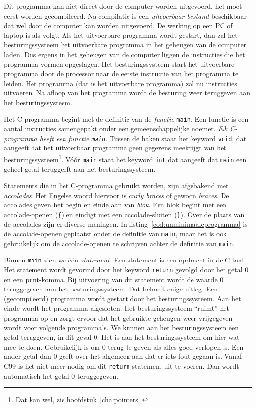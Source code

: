 Dit programma kan niet direct door de computer worden uitgevoerd, het moet eerst worden gecompileerd. Na compilatie is een \textsl{uitvoerbaar bestand} beschikbaar dat wel door de computer kan worden uitgevoerd. De werking op een PC of laptop is als volgt. Als het uitvoerbare programma wordt gestart, dan zal het besturingssysteem het uitvoerbare programma in het geheugen van de computer laden. Dus ergens in het geheugen van de computer liggen de instructies die het programma vormen opgeslagen. Het besturingssysteem start het uitvoerbare programma door de processor naar de eerste instructie van het programma te leiden. Het programma (dat is het uitvoerbare programma) zal nu instructies uitvoeren. Na afloop van het programma wordt de besturing weer teruggeven aan het besturingssysteem.

Het C-programma begint met de definitie van de \textsl{functie} \texttt{main}. Een functie is een aantal instructies samengepakt onder een gemeenschappelijke noemer. \textsl{Elk C-programma heeft een functie \texttt{main}}. Tussen de haken staat het keyword \texttt{void}, dat aangeeft dat het uitvoerbaar programma geen gegevens meekrijgt van het besturingssysteem\footnote{Dat kan wel, zie hoofdstuk~\ref{cha:pointers}.}. Vóór \texttt{main} staat het keyword \texttt{int} dat aangeeft dat \texttt{main} een geheel getal teruggeeft aan het besturingssysteem.
 
Statements die in het C-programma gebruikt worden, zijn afgebakend met \textsl{accolades}. Het Engelse woord hiervoor is \textsl{curly braces} of gewoon \textsl{braces}. De accolades geven het begin en einde aan van \textsl{blok}. Een blok begint met een accolade-openen (\texttt{\{}) en eindigt met een accolade-sluiten (\texttt{\}}). Over de plaats van de accolades zijn er diverse meningen. In listing~\ref{cod:unminimaalcprogramma} is de accolade-openen geplaatst onder de definitie van \texttt{main}, maar het is ook gebruikelijk om de accolade-openen te schrijven achter de definitie van \texttt{main}.
 
Binnen \texttt{main} zien we één \textsl{statement}. Een statement is een opdracht in de C-taal. Het statement wordt gevormd door het keyword \texttt{return} gevolgd door het getal 0 en een punt-komma. Bij uitvoering van dit statement wordt de waarde 0 teruggegeven aan het besturingssysteem. Dat behoeft enige uitleg. Een (gecompileerd) programma wordt gestart door het besturingssysteem. Aan het einde wordt het programma afgesloten. Het besturingssysteem ``ruimt'' het programma op en zorgt ervoor dat het gebruikte geheugen weer vrijgegeven wordt voor volgende programma's. We kunnen aan het besturingssysteem een getal teruggeven, in dit geval 0. Het is aan het besturingssysteem om hier wat mee te doen. Gebruikelijk is om 0 terug te geven als alles goed verlopen is. Een ander getal dan 0 geeft over het algemeen aan dat er iets fout gegaan is. Vanaf C99 is het niet meer nodig om dit \texttt{return}-statement uit te voeren. Dan wordt automatisch het getal 0 teruggegeven.


